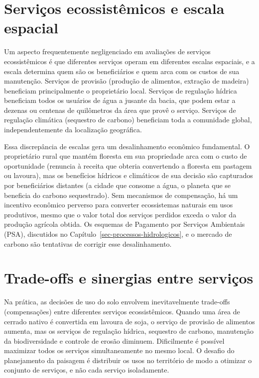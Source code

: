 \documentclass[
  portuguese,
  11pt,
  a4paper,
  open=any]{scrbook}
\begin{document}
\section{Serviços ecossistêmicos e escala
espacial}\label{serviuxe7os-ecossistuxeamicos-e-escala-espacial}

Um aspecto frequentemente negligenciado em avaliações de serviços
ecossistêmicos é que diferentes serviços operam em diferentes escalas
espaciais, e a escala determina quem são os beneficiários e quem arca
com os custos de sua manutenção. Serviços de provisão (produção de
alimentos, extração de madeira) beneficiam principalmente o proprietário
local. Serviços de regulação hídrica beneficiam todos os usuários de
água a jusante da bacia, que podem estar a dezenas ou centenas de
quilômetros da área que provê o serviço. Serviços de regulação climática
(sequestro de carbono) beneficiam toda a comunidade global,
independentemente da localização geográfica.

Essa discrepância de escalas gera um desalinhamento econômico
fundamental. O proprietário rural que mantém floresta em sua propriedade
arca com o custo de oportunidade (renuncia à receita que obteria
convertendo a floresta em pastagem ou lavoura), mas os benefícios
hídricos e climáticos de sua decisão são capturados por beneficiários
distantes (a cidade que consome a água, o planeta que se beneficia do
carbono sequestrado). Sem mecanismos de compensação, há um incentivo
econômico perverso para converter ecossistemas naturais em usos
produtivos, mesmo que o valor total dos serviços perdidos exceda o valor
da produção agrícola obtida. Os esquemas de Pagamento por Serviços
Ambientais (PSA), discutidos no
Capítulo~\ref{sec-processos-hidrologicos}, e o mercado de carbono são
tentativas de corrigir esse desalinhamento.

\section{Trade-offs e sinergias entre
serviços}\label{trade-offs-e-sinergias-entre-serviuxe7os}

Na prática, as decisões de uso do solo envolvem inevitavelmente
trade-offs (compensações) entre diferentes serviços ecossistêmicos.
Quando uma área de cerrado nativo é convertida em lavoura de soja, o
serviço de provisão de alimentos aumenta, mas os serviços de regulação
hídrica, sequestro de carbono, manutenção da biodiversidade e controle
de erosão diminuem. Dificilmente é possível maximizar todos os serviços
simultaneamente no mesmo local. O desafio do planejamento da paisagem é
distribuir os usos no território de modo a otimizar o conjunto de
serviços, e não cada serviço isoladamente.
\end{document}
